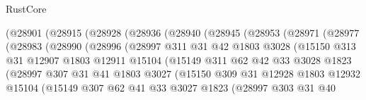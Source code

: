 \begin{lexlean}{RustCore}
\begin{coremodule}
              (@28901
                (@28915
                  (@28928
                    (@28936
                      (@28940
                        (@28945
                          (@28953
                            (@28971
                              (@28977
                                (@28983
                                  (@28990
                                    (@28996
                                      (@28997
                                        @311
                                        @31
                                        @42
                                        @1803
                                        @3028
                                        (@15150
                                          @313
                                          @31
                                          @12907
                                          @1803
                                          @12911
                                          @15104
                                          (@15149
                                            @311
                                            @62
                                            @42
                                            @33
                                            @3028
                                            @1823
                                            (@28997
                                              @307
                                              @31
                                              @41
                                              @1803
                                              @3027
                                              (@15150
                                                @309
                                                @31
                                                @12928
                                                @1803
                                                @12932
                                                @15104
                                                (@15149
                                                  @307
                                                  @62
                                                  @41
                                                  @33
                                                  @3027
                                                  @1823
                                                  (@28997
                                                    @303
                                                    @31
                                                    @40

\end{coremodule}
\end{lexlean}
